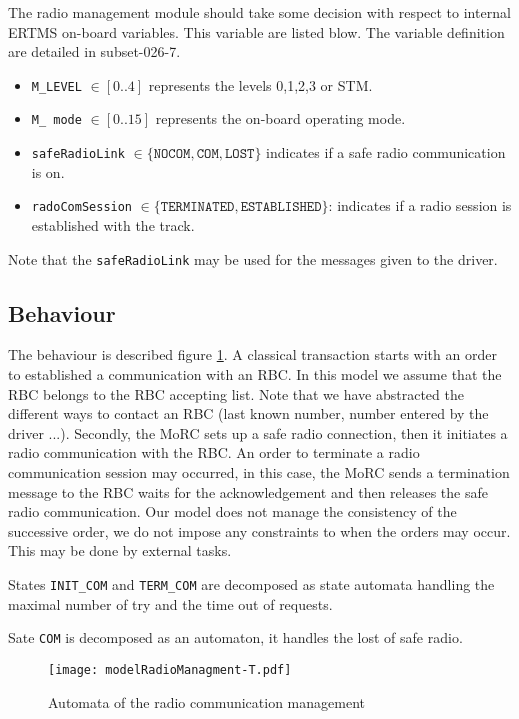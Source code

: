 The radio management module should take some decision with respect to internal
ERTMS on-board variables. This variable are listed blow. The variable definition
are detailed in subset-026-7.
\begin{itemize}
\item \verb+M_LEVEL+ $\in [0..4]$ represents the levels 0,1,2,3 or STM.
\item \verb+M_ mode+ $\in[0..15]$ represents the on-board operating mode.
\item \verb+safeRadioLink+ $\in \{\mathtt{NOCOM, COM, LOST}\}$ indicates if a safe radio communication is on.
\item \verb+radoComSession+ $\in \{\mathtt{TERMINATED, ESTABLISHED}\}$: indicates if a radio session is established with the track.
\end{itemize} 
Note that the \verb+safeRadioLink+ may be used for the messages given to the
driver.

\subsection{Behaviour}
\label{subsec:behavior}

The behaviour is described figure \ref{fig:behavior}.
A classical transaction starts with an order to established a communication with
an RBC. In this model we assume that the RBC belongs to the RBC accepting list.
Note that we have abstracted the different ways to contact an RBC (last known
number, number entered by the driver ...). Secondly, the MoRC sets up a safe radio
connection, then it initiates a radio communication with the RBC.
An order to terminate a radio communication session may occurred, in this case,
the MoRC sends a termination message to the RBC waits for the acknowledgement and
then releases the safe radio communication.
Our model does not manage the consistency of the successive order, we do not
impose any constraints to when the orders may occur. This may be done by external
tasks.

States \verb+INIT_COM+ and \verb+TERM_COM+ are decomposed as state automata
handling the maximal number of try and the time out of requests.

Sate \verb+COM+ is decomposed as an automaton, it handles the lost of safe
radio.
\begin{figure}[htpb]
\centering
\texttt{[image: modelRadioManagment-T.pdf]}
\caption{\label{fig:behavior}Automata of the radio communication management}
\end{figure}

